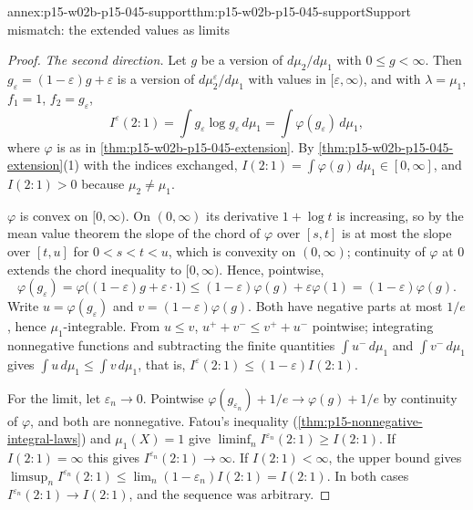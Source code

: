 \begin{annexitem}{annex:p15-w02b-p15-045-support}{thm:p15-w02b-p15-045-support}{Support mismatch: the extended values as limits}
\begin{proof}
\emph{The second direction.} Let \(g\) be a version of
\(d\mu_2/d\mu_1\) with \(0\leq g<\infty\). Then
\(g_\varepsilon=(1-\varepsilon)g+\varepsilon\) is a version of
\(d\mu_2^\varepsilon/d\mu_1\) with values in \([\varepsilon,\infty)\),
and with \(\lambda=\mu_1\), \(f_1=1\), \(f_2=g_\varepsilon\),
\[
  I^\varepsilon(2:1)=\int g_\varepsilon\log g_\varepsilon\,d\mu_1=\int\varphi(g_\varepsilon)\,d\mu_1,
\]
where \(\varphi\) is as in \cref{thm:p15-w02b-p15-045-extension}. By
\cref{thm:p15-w02b-p15-045-extension}(1) with the indices exchanged,
\(I(2:1)=\int\varphi(g)\,d\mu_1\in[0,\infty]\), and \(I(2:1)>0\)
because \(\mu_2\neq\mu_1\).

\(\varphi\) is convex on \([0,\infty)\). On \((0,\infty)\) its
derivative \(1+\log t\) is increasing, so by the mean value theorem the
slope of the chord of \(\varphi\) over \([s,t]\) is at most the slope
over \([t,u]\) for \(0<s<t<u\), which is convexity on \((0,\infty)\);
continuity of \(\varphi\) at \(0\) extends the chord inequality to
\([0,\infty)\). Hence, pointwise,
\[
  \varphi(g_\varepsilon)=\varphi\bigl((1-\varepsilon)g+\varepsilon\cdot1\bigr)
  \leq(1-\varepsilon)\varphi(g)+\varepsilon\varphi(1)=(1-\varepsilon)\varphi(g).
\]
Write \(u=\varphi(g_\varepsilon)\) and \(v=(1-\varepsilon)\varphi(g)\).
Both have negative parts at most \(1/e\), hence \(\mu_1\)-integrable.
From \(u\leq v\), \(u^++v^-\leq v^++u^-\) pointwise; integrating
nonnegative functions and subtracting the finite quantities
\(\int u^-\,d\mu_1\) and \(\int v^-\,d\mu_1\) gives
\(\int u\,d\mu_1\leq\int v\,d\mu_1\), that is,
\(I^\varepsilon(2:1)\leq(1-\varepsilon)I(2:1)\).

For the limit, let \(\varepsilon_n\to0\). Pointwise
\(\varphi(g_{\varepsilon_n})+1/e\to\varphi(g)+1/e\) by continuity of
\(\varphi\), and both are nonnegative. Fatou's inequality
(\cref{thm:p15-nonnegative-integral-laws}) and \(\mu_1(X)=1\) give
\(\liminf_n I^{\varepsilon_n}(2:1)\geq I(2:1)\). If \(I(2:1)=\infty\)
this gives \(I^{\varepsilon_n}(2:1)\to\infty\). If \(I(2:1)<\infty\), the
upper bound gives
\(\limsup_nI^{\varepsilon_n}(2:1)\leq\lim_n(1-\varepsilon_n)I(2:1)=I(2:1)\).
In both cases \(I^{\varepsilon_n}(2:1)\to I(2:1)\), and the sequence was
arbitrary.


\end{proof}
\end{annexitem}
